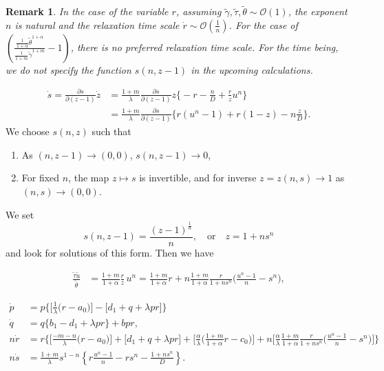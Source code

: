 \documentclass[a4paper,11pt]{article}
\def\tg{{\tilde{\gamma}}}
\def\tv{{\tilde{v}}}
\def\tth{{\tilde{\theta}}}
\def\ts{{\tilde{\tau}}}
\def\tu{{\tilde{u}}}
\def\dpp{\dot{p}}
\def\dqq{\dot{q}}
\def\drr{\dot{r}}
\newtheorem{remark}{Remark}[section]
\begin{document}
\begin{remark}
 In the case of the variable $r$, assuming $\tg, \ts,\tth \sim \mathcal{O}(1)$, the exponent $n$ is natural and the relaxation time scale $\drr \sim \mathcal{O}(\frac{1}{n})$. For the case of $\displaystyle\left(\frac{ \frac{1}{1+\alpha}\tth^{1+\alpha}}{ \frac{1}{1+m}\tg^{1+m} } -1 \right)$, there is no preferred relaxation time scale. For the time being, we do not specify the function $s(n,z-1)$ in the upcoming calculations.
\end{remark}
\begin{align*}
 \dot{s} =\frac{\partial s}{\partial (z-1)} \dot{z}
 &= \frac{1+m}{\lambda}\frac{\partial s}{\partial (z-1)} z\bigg\{-r - \frac{n}{D}+ \frac{r}{z}u^n\bigg\}\\
 &=\frac{1+m}{\lambda}\frac{\partial s}{\partial (z-1)} \bigg\{r(u^n-1) +r(1-z) -n\frac{z}{D}\bigg\}.
\end{align*}
We choose $s(n,z)$ such that
\begin{enumerate}
 \item As $(n,z-1) \rightarrow (0,0)$, $s(n,z-1) \rightarrow 0$, 
 \item For fixed $n$, the map $z \mapsto s$ is invertible, and for inverse $z=z(n,s)\rightarrow 1$ as $(n,s) \rightarrow (0,0)$.
\end{enumerate}
We set 
$$ s(n,z-1) = \frac{(z-1)^{\frac{1}{n}}}{n}, \quad \text{or} \quad z= 1+ns^n$$
and look for solutions of this form. Then we have


\begin{align*}
 \frac{\ts\tu}{\tth} &= \frac{1+m}{1+\alpha} \frac{r}{z}\,u^n = \frac{1+m}{1+\alpha} r + n\frac{1+m}{1+\alpha} \frac{r}{1+ns^n}\Big(\frac{u^n-1}{n}-s^n\Big),%
\end{align*}





\begin{equation}
\begin{aligned}
  {\dpp}&=p\bigg\{\Big[\frac{1}{\lambda }\Big(r-a_0\Big)\Big] -\Big[d_1 + q + \lambda p r\Big]\bigg\}\\
  {\dqq}&=q\bigg\{b_1-d_1 + \lambda p r\bigg\} +bpr,\\
 n{\drr}&=r\bigg\{\Big[\frac{-m-n}{\lambda }\Big(r-a_0\Big)\Big]+\Big[d_1 + q + \lambda p r\Big]+\Big[\frac{\alpha}{\lambda }\Big(\frac{1+m}{1+\alpha}r-c_0\Big)\Big] + n\Big[\frac{\alpha}{\lambda }\frac{1+m}{1+\alpha} \frac{r}{1+ns^n}\Big(\frac{u^n-1}{n}-s^n\Big)\Big]\bigg\}\\
 n\dot{s}&=\frac{1+m}{\lambda}s^{1-n} \left\{r\frac{u^n-1}{n} - rs^n -\frac{1+ns^n}{D}\right\}.
\end{aligned}
\end{equation}
\end{document}
